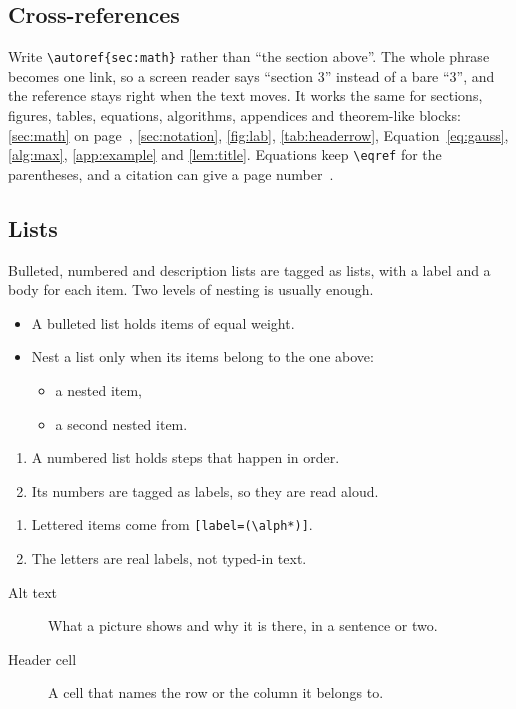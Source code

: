 \documentclass[12pt]{article}
\begin{document}
\subsection{Cross-references}
Write \verb|\autoref{sec:math}| rather than ``the section above''. The whole
phrase becomes one link, so a screen reader says ``section 3'' instead of a
bare ``3'', and the reference stays right when the text moves. It works the
same for sections, figures, tables, equations, algorithms, appendices and
theorem-like blocks: \autoref{sec:math} on page~\pageref{sec:math},
\autoref{sec:notation}, \autoref{fig:lab}, \autoref{tab:headerrow},
Equation~\eqref{eq:gauss}, \autoref{alg:max}, \autoref{app:example} and
\autoref{lem:title}. Equations keep \verb|\eqref| for the parentheses, and a
citation can give a page number~\cite[p.~3]{knuth1984lp}.
\subsection{Lists}
Bulleted, numbered and description lists are tagged as lists, with a label and
a body for each item. Two levels of nesting is usually enough.
\begin{itemize}
  \item A bulleted list holds items of equal weight.
  \item Nest a list only when its items belong to the one above:
    \begin{itemize} \item a nested item, \item a second nested item. \end{itemize}
\end{itemize}
\begin{enumerate}
  \item A numbered list holds steps that happen in order.
  \item Its numbers are tagged as labels, so they are read aloud.
\end{enumerate}
\begin{enumerate}[label=(\alph*)]
  \item Lettered items come from \verb|[label=(\alph*)]|.
  \item The letters are real labels, not typed-in text.
\end{enumerate}
\begin{description}
  \item[Alt text] What a picture shows and why it is there, in a sentence or two.
  \item[Header cell] A cell that names the row or the column it belongs to.
\end{description}
\end{document}
